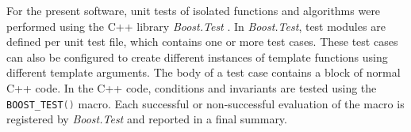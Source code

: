 For the present software, unit tests of isolated functions and algorithms were performed using the 
C++ library \textit{Boost.Test} \cite{web_boost_test}.
In \textit{Boost.Test}, test modules are defined per unit test file, which contains one or more test cases.
These test cases can also be configured to create different instances of template functions using
different template arguments. The body of a test case contains a block of normal C++ code.
In the C++ code, conditions and invariants are tested using the 
\lstinline[language=C++]|BOOST_TEST()| macro. Each successful or non-successful evaluation
of the macro is registered by \textit{Boost.Test} and reported in a final summary.
